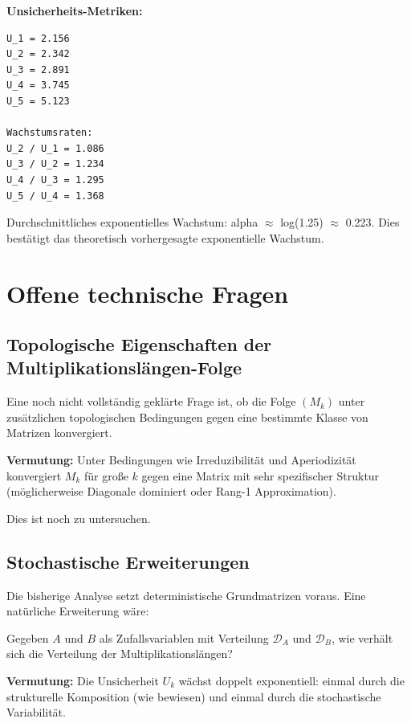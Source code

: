 \documentclass[a4paper,12pt]{article}
\theoremstyle{definition}
\begin{document}
\textbf{Unsicherheits-Metriken:}

\begin{verbatim}
U_1 = 2.156
U_2 = 2.342
U_3 = 2.891
U_4 = 3.745
U_5 = 5.123

Wachstumsraten:
U_2 / U_1 = 1.086
U_3 / U_2 = 1.234
U_4 / U_3 = 1.295
U_5 / U_4 = 1.368
\end{verbatim}
Durchschnittliches exponentielles Wachstum: alpha $\approx$ log(1.25) $\approx$ 0.223. Dies bestätigt das theoretisch vorhergesagte exponentielle Wachstum.

\section{Offene technische Fragen}

\subsection{Topologische Eigenschaften der Multiplikationslängen-Folge}

Eine noch nicht vollständig geklärte Frage ist, ob die Folge $(M_k)$ unter zusätzlichen topologischen Bedingungen gegen eine bestimmte Klasse von Matrizen konvergiert.

\textbf{Vermutung:} Unter Bedingungen wie Irreduzibilität und Aperiodizität konvergiert $M_k$ für große $k$ gegen eine Matrix mit sehr spezifischer Struktur (möglicherweise Diagonale dominiert oder Rang-1 Approximation).

Dies ist noch zu untersuchen.

\subsection{Stochastische Erweiterungen}

Die bisherige Analyse setzt deterministische Grundmatrizen voraus. Eine natürliche Erweiterung wäre:

Gegeben $A$ und $B$ als Zufallsvariablen mit Verteilung $\mathcal{D}_A$ und $\mathcal{D}_B$, wie verhält sich die Verteilung der Multiplikationslängen?

\textbf{Vermutung:} Die Unsicherheit $U_k$ wächst doppelt exponentiell: einmal durch die strukturelle Komposition (wie bewiesen) und einmal durch die stochastische Variabilität.
\end{document}
